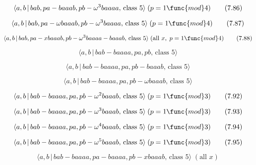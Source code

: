 \documentclass[10pt]{article}
\begin{document}
\begin{equation}
\langle a,b\,|\,bab,pa-baaab,pb-\omega ^{3}baaaa,\,\text{class }5\rangle
\;(p=1\func{mod}4)  \tag{7.86}
\end{equation}

\begin{equation}
\langle a,b\,|\,bab,pa-\omega baaab,pb-\omega ^{3}baaaa,\,\text{class }%
5\rangle \;(p=1\func{mod}4)  \tag{7.87}
\end{equation}

\begin{equation}
\langle a,b\,|\,bab,pa-xbaaab,pb-\omega ^{3}baaaa-baaab,\,\text{class }%
5\rangle \;(\text{all }x,\;p=1\func{mod}4)  \tag{7.88}
\end{equation}

\begin{equation}
\langle a,b\,|\,bab-baaaa,pa,pb,\,\text{class }5\rangle  \tag{7.89}
\end{equation}

\begin{equation}
\langle a,b\,|\,bab-baaaa,pa,pb-baaab,\,\text{class }5\rangle  \tag{7.90}
\end{equation}

\begin{equation}
\langle a,b\,|\,bab-baaaa,pa,pb-\omega baaab,\,\text{class }5\rangle 
\tag{7.91}
\end{equation}

\begin{equation}
\langle a,b\,|\,bab-baaaa,pa,pb-\omega ^{2}baaab,\,\text{class }5\rangle
\;(p=1\func{mod}3)  \tag{7.92}
\end{equation}

\begin{equation}
\langle a,b\,|\,bab-baaaa,pa,pb-\omega ^{3}baaab,\,\text{class }5\rangle
\;(p=1\func{mod}3)  \tag{7.93}
\end{equation}

\begin{equation}
\langle a,b\,|\,bab-baaaa,pa,pb-\omega ^{4}baaab,\,\text{class }5\rangle
\;(p=1\func{mod}3)  \tag{7.94}
\end{equation}

\begin{equation}
\langle a,b\,|\,bab-baaaa,pa,pb-\omega ^{5}baaab,\,\text{class }5\rangle
\;(p=1\func{mod}3)  \tag{7.95}
\end{equation}

\begin{equation}
\langle a,b\,|\,bab-baaaa,pa-baaaa,pb-xbaaab,\,\text{class }5\rangle \;(%
\text{all }x)  \tag{7.96}
\end{equation}
\end{document}
